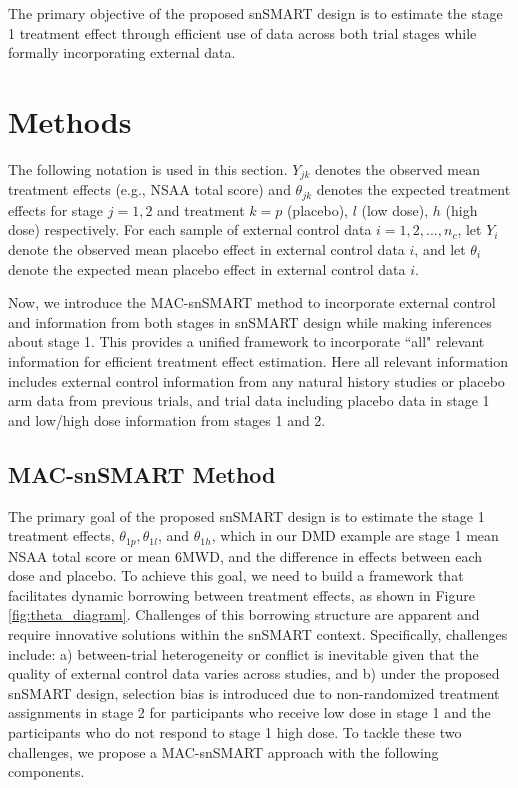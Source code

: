 The primary objective of the proposed \ac{snSMART} design is to estimate the stage 1 treatment effect through efficient use of data across both trial stages while formally incorporating external data. 

\section{Methods} \label{s:methods}
 
The following notation is used in this section. $Y_{jk}$ denotes the observed mean treatment effects (e.g., \ac{NSAA} total score) and $\theta_{jk}$ denotes the expected treatment effects for stage $j = 1, 2$ and treatment $k = p$ (placebo), $l$ (low dose), $h$ (high dose) respectively. For each sample of external control data $i = 1, 2, ..., n_c$, let $Y_i$ denote the observed mean placebo effect in external control data $i$, and let $\theta_i$ denote the expected mean placebo effect in external control data $i$. 

Now, we introduce the MAC-snSMART method to incorporate external control and information from both stages in \ac{snSMART} design while making inferences about stage 1. This provides a unified framework to incorporate ``all" relevant information for efficient treatment effect estimation. Here all relevant information includes external control information from any natural history studies or placebo arm data from previous trials, and trial data including placebo data in stage 1 and low/high dose information from stages 1 and 2.

\subsection{MAC-snSMART Method}
The primary goal of the proposed \ac{snSMART} design is to estimate the stage 1 treatment effects, $\theta_{1p}, \theta_{1l}$, and $\theta_{1h}$, which in our \ac{DMD} example are stage 1 mean \ac{NSAA} total score or mean \ac{6MWD}, and the difference in effects between each dose and placebo. To achieve this goal, we need to build a framework that facilitates dynamic borrowing between treatment effects, as shown in Figure \ref{fig:theta_diagram}. Challenges of this borrowing structure are apparent and require innovative solutions within the \ac{snSMART} context. Specifically, challenges include: a)  between-trial heterogeneity or conflict is inevitable given that the quality of external control data varies across studies, and b) under the proposed \ac{snSMART} design, selection bias is introduced due to non-randomized treatment assignments in stage 2 for participants who receive low dose in stage 1 and the participants who do not respond to stage 1 high dose. To tackle these two challenges, we propose a \ac{MAC}-snSMART approach with the following components.

